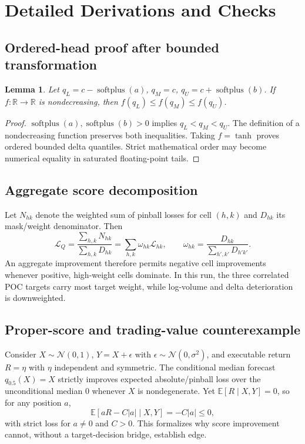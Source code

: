 \documentclass[10pt,letterpaper]{article}
\numberwithin{equation}{section}
\newcommand{\E}{\mathbb{E}}
\newcommand{\R}{\mathbb{R}}
\newcommand{\softplus}{\operatorname{softplus}}
\newtheorem{lemma}{Lemma}
\theoremstyle{definition}
\theoremstyle{remark}
\begin{document}
\appendix

\section{Detailed Derivations and Checks}

\subsection{Ordered-head proof after bounded transformation}

\begin{lemma}
Let \(q_L=c-\softplus(a)\), \(q_M=c\), \(q_U=c+\softplus(b)\). If
\(f:\R\rightarrow\R\) is nondecreasing, then
\(f(q_L)\leq f(q_M)\leq f(q_U)\).
\end{lemma}
\begin{proof}
\(\softplus(a),\softplus(b)>0\) implies \(q_L<q_M<q_U\). The definition of a
nondecreasing function preserves both inequalities. Taking \(f=\tanh\) proves
ordered bounded delta quantiles. Strict mathematical order may become numerical
equality in saturated floating-point tails.
\end{proof}

\subsection{Aggregate score decomposition}

Let \(N_{hk}\) denote the weighted sum of pinball losses for cell \((h,k)\) and
\(D_{hk}\) its mask/weight denominator. Then
\begin{equation}
\mathcal{L}_Q
=\frac{\sum_{h,k}N_{hk}}{\sum_{h,k}D_{hk}}
=\sum_{h,k}\omega_{hk}\mathcal{L}_{hk},\qquad
\omega_{hk}=\frac{D_{hk}}{\sum_{h',k'}D_{h'k'}}.
\label{eq:score-decomposition}
\end{equation}
An aggregate improvement therefore permits negative cell improvements whenever
positive, high-weight cells dominate. In this run, the three correlated POC
targets carry most target weight, while log-volume and delta deterioration is
downweighted.

\subsection{Proper-score and trading-value counterexample}

Consider \(X\sim\mathcal{N}(0,1)\),
\(Y=X+\epsilon\) with \(\epsilon\sim\mathcal{N}(0,\sigma^2)\), and executable
return \(R=\eta\) with \(\eta\) independent and symmetric. The conditional
median forecast \(q_{0.5}(X)=X\) strictly improves expected absolute/pinball
loss over the unconditional median 0 whenever \(X\) is nondegenerate. Yet
\(\E[R\mid X,Y]=0\), so for any position \(a\),
\begin{equation}
\E[aR-C|a|\mid X,Y]=-C|a|\leq0,
\label{eq:counterexample}
\end{equation}
with strict loss for \(a\neq0\) and \(C>0\). This formalizes why score
improvement cannot, without a target-decision bridge, establish edge.
\end{document}

